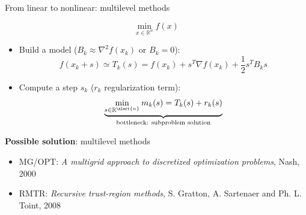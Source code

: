 \documentclass{beamer}
\begin{document}
\begin{frame}{From linear to nonlinear: multilevel methods}
	\begin{tcolorbox}[
    colback=gray!10,
    colframe=gray!70!black,
        fonttitle=\bfseries,
]


$$
	\min_{x\in\mathbb{R}^n}f(x)
	$$
	 \end{tcolorbox}
	\begin{itemize}
	\item Build a \alert{model} ($B_k\approx \nabla^2 f(x_k)$ or $B_k=0$):
	\begin{equation*}
	f(x_k+s)\simeq T_{k}(s)=f(x_k)+s^T\nabla f(x_k)+\frac{1}{2}s^TB_ks
	\end{equation*}
	\vspace{-0.5cm}
	\item Compute a \alert{step} $s_k$ ($r_k$ regularization term):
	\begin{equation*}
	\underbrace{\min_{s\in\mathbb{R}^{\alert{n}}} m_{k}(s)=T_{k}(s)+r_k(s)}_{\text{bottleneck: subproblem solution}}
	\end{equation*}
	\vspace{-0.5cm}

	\end{itemize}






	
		\vspace{0.5cm}

\pause
\begin{block}{ {\bf Possible solution}:  \alert{multilevel methods} }
		
		\begin{small}
	\begin{itemize}
	\item 
	 \alert{MG/OPT: } \textit{A multigrid approach to discretized optimization problems}, {\color{black} Nash}, {\color{black} 2000}
		\item  \alert{RMTR: } \textit{Recursive trust-region methods}, {\color{black} S. Gratton, A. Sartenaer and  Ph. L. Toint, 2008}

	\end{itemize}
	\end{small}


	\end{block}		
\end{frame}
\end{document}
